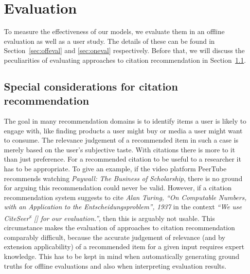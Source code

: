 \chapter{Evaluation}\label{chap:evaluation}
To measure the effectiveness of our models, we evaluate them in an offline evaluation as well as a user study. The details of these can be found in Section~\ref{sec:offeval} and \ref{sec:oneval} respectively. Before that, we will discuss the peculiarities of evaluating approaches to citation recommendation in Section~\ref{sec:citrecspecial}.

\section{Special considerations for citation recommendation}\label{sec:citrecspecial}
The goal in many recommendation domains is to identify items a user is likely to engage with, like finding products a user might buy or media a user might want to consume. The relevance judgement of a recommended item in such a case is merely based on the user's subjective taste.
With citations there is more to it than just preference. For a recommended citation to be useful to a researcher it has to be appropriate. To give an example, if the video platform PeerTube recommends watching \emph{Paywall: The Business of Scholarship}, there is no ground for arguing this recommendation could never be valid. However, if a citation recommendation system suggests to cite \emph{Alan Turing, ``On Computable Numbers, with an Application to the Entscheidungsproblem'', 1937} in the context \emph{``We use CiteSeer\textsuperscript{x} [] for our evaluation.''}, then this is arguably not usable. This circumstance makes the evaluation of approaches to citation recommendation comparably difficult, because the accurate judgement of relevance (and by extension applicability) of a recommended item for a given input requires expert knowledge. This has to be kept in mind when automatically generating ground truths for offline evaluations and also when interpreting evaluation results.


